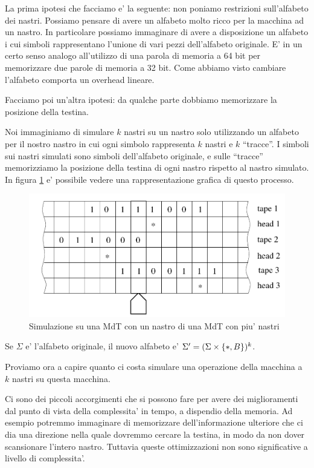La prima ipotesi che facciamo e' la seguente: non poniamo restrizioni sull'alfabeto dei nastri.
Possiamo pensare di avere un alfabeto molto ricco per la macchina ad un nastro. In particolare
possiamo immaginare di avere a disposizione un alfabeto i cui simboli rappresentano l'unione di vari
pezzi dell'alfabeto originale. E' in un certo senso analogo all'utilizzo di una parola di memoria a
64 bit per memorizzare due parole di memoria a 32 bit. Come abbiamo visto cambiare l'alfabeto
comporta un overhead lineare.

Facciamo poi un'altra ipotesi: da qualche parte dobbiamo memorizzare la posizione della testina.

Noi immaginiamo di simulare $k$ nastri su un nastro solo utilizzando un alfabeto per il nostro
nastro in cui ogni simbolo rappresenta $k$ nastri e $k$ ``tracce''. I simboli sui nastri simulati
sono simboli dell'alfabeto originale, e sulle ``tracce'' memorizziamo la posizione della testina di
ogni nastro rispetto al nastro simulato. In figura \ref{img:KTapesToOne} e' possibile vedere una rappresentazione
grafica di questo processo.

\begin{figure}[h]
    \begin{center}
        \includegraphics[scale=0.3]{./img/KTapesToOne.png}    
        \caption{Simulazione su una MdT con un nastro di una MdT con piu' nastri}
        \label{img:KTapesToOne}
    \end{center}
\end{figure}

Se $\Sigma$ e' l'alfabeto originale, il nuovo alfabeto e' $\Sigma' = (\Sigma \times
\{*,B\})^{k}$.

Proviamo ora a capire quanto ci costa simulare una operazione della macchina a $k$ nastri su questa
macchina.

Ci sono dei piccoli accorgimenti che si possono fare per avere dei miglioramenti dal punto di vista
della complessita' in tempo, a dispendio della memoria. Ad esempio potremmo immaginare di
memorizzare dell'informazione ulteriore che ci dia una direzione nella quale dovremmo cercare la
testina, in modo da non dover scansionare l'intero nastro. Tuttavia queste ottimizzazioni non sono
significative a livello di complessita'.

